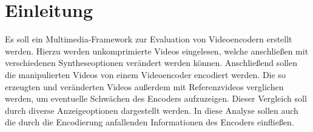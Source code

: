 \section{Einleitung}

Es soll ein Multimedia-Framework zur Evaluation von Videoencodern erstellt werden. Hierzu werden unkomprimierte Videos eingelesen, welche anschließen mit verschiedenen Syntheseoptionen verändert werden können. Anschließend sollen die manipulierten Videos von einem Videoencoder encodiert werden. Die so erzeugten und veränderten Videos außerdem mit Referenzvideos verglichen werden, um eventuelle Schwächen des Encoders aufzuzeigen. Dieser Vergleich soll durch diverse Anzeigeoptionen dargestellt werden. In diese Analyse sollen auch die durch die Encodierung anfallenden Informationen des Encoders einfließen.
